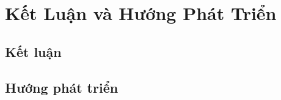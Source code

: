 \def\baselinestretch{1}
\chapter{Kết Luận và Hướng Phát Triển}
\ifpdf
    \graphicspath{{Conclusions/ConclusionsFigs/PNG/}{Conclusions/ConclusionsFigs/PDF/}{Conclusions/ConclusionsFigs/}}
\else
    \graphicspath{{Conclusions/ConclusionsFigs/EPS/}{Conclusions/ConclusionsFigs/}}
\fi

\def\baselinestretch{1.66}

\section{Kết luận}
\section{Hướng phát triển}



